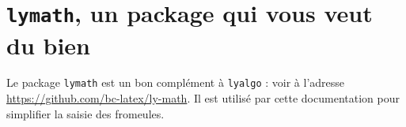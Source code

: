 \documentclass[12pt,a4paper]{article}
\begin{document}
\section{\texttt{lymath}, un package qui vous veut du bien}

Le package \verb+lymath+ est un bon complément à \verb+lyalgo+ : voir à l'adresse \url{https://github.com/bc-latex/ly-math}. 
Il est utilisé par cette documentation pour simplifier la saisie des fromeules.
\end{document}

